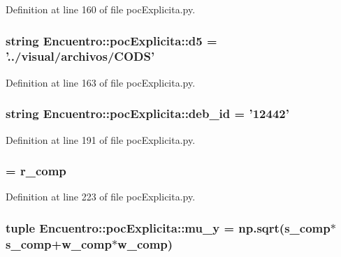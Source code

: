 \-Definition at line 160 of file poc\-Explicita.\-py.

\subsubsection[{d5}]{\setlength{\rightskip}{0pt plus 5cm}string {\bf \-Encuentro\-::poc\-Explicita\-::d5} = '../visual/archivos/\-C\-O\-D\-S'}\label{namespace_encuentro_1_1poc_explicita_a1af5c083590ce8fe3a0ec7a823fbb886}


\-Definition at line 163 of file poc\-Explicita.\-py.

\subsubsection[{deb\-\_\-id}]{\setlength{\rightskip}{0pt plus 5cm}string {\bf \-Encuentro\-::poc\-Explicita\-::deb\-\_\-id} = '12442'}\label{namespace_encuentro_1_1poc_explicita_a588db6ca344e22d20c74848b0e0a969a}


\-Definition at line 191 of file poc\-Explicita.\-py.

\subsubsection[{mu\-\_\-x}]{ = {\bf r\-\_\-comp}}\label{namespace_encuentro_1_1poc_explicita_abcf7993ec3b4090b516135d6fd93ef38}


\-Definition at line 223 of file poc\-Explicita.\-py.

\subsubsection[{mu\-\_\-y}]{\setlength{\rightskip}{0pt plus 5cm}tuple {\bf \-Encuentro\-::poc\-Explicita\-::mu\-\_\-y} = np.\-sqrt({\bf s\-\_\-comp}$\ast${\bf s\-\_\-comp}+{\bf w\-\_\-comp}$\ast${\bf w\-\_\-comp})}\label{namespace_encuentro_1_1poc_explicita_a15601a1c8f374b15240d4f1519949fc0}


